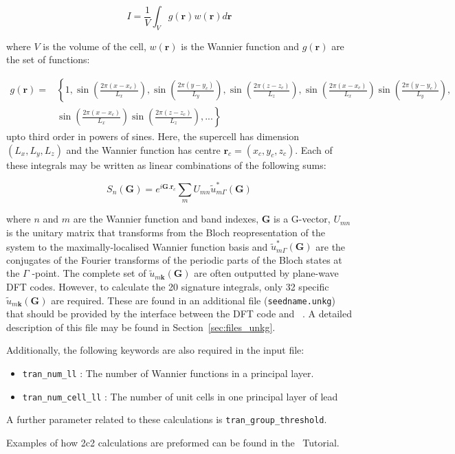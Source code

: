 \begin{equation}
I=\frac{1}{V}\int_V g(\mathbf{r})w(\mathbf{r})d\mathbf{r}
\label{eq:sig_ints}
\end{equation}

where $V$ is the volume of the cell, $w(\mathbf{r})$ is the Wannier 
function and $g(\mathbf{r})$ are the set of functions:

\begin{eqnarray}
g(\mathbf{r})=&\left\lbrace1,\sin\left(\frac{2\pi (x-x_c)}{L_x}\right),
											 \sin\left(\frac{2\pi (y-y_c)}{L_y}\right),
											 \sin\left(\frac{2\pi (z-z_c)}{L_z}\right),
											 \sin\left(\frac{2\pi (x-x_c)}{L_x}\right)
											 \sin\left(\frac{2\pi (y-y_c)}{L_y}\right),\right.\nonumber \\
										   &\left.\sin\left(\frac{2\pi (x-x_c)}{L_x}\right)
											 \sin\left(\frac{2\pi (z-z_c)}{L_z}\right),
											 ... \right\rbrace
\label{eq:g(r)}
\end{eqnarray}
upto third order in powers of sines. Here, the supercell has dimension 
$(L_x,L_y,L_z)$ and the Wannier function has centre $\mathbf{r}_c=(x_c,y_c,z_c)$.
Each of these integrals may be written as linear combinations 
of the following sums:

\begin{equation}
S_n(\mathbf{G})=\displaystyle{e^{i\mathbf{G.r}_{c}}\sum_{m}U_{mn}\tilde{u}_{m\Gamma}^{*}(\mathbf{G})}
\end{equation}

where $n$ and $m$ are the Wannier function and band indexes, 
$\mathbf{G}$ is a G-vector, $U_{mn}$ is the unitary matrix that 
transforms from the Bloch reopresentation of the system to the 
maximally-localised Wannier function basis and 
$\tilde{u}_{m\Gamma}^{*}(\mathbf{G})$ are the conjugates of the 
Fourier transforms of the periodic parts of the Bloch states at the $\Gamma\!$
-point. The complete set of $\tilde{u}_{m\mathbf{k}}(\mathbf{G})$ 
are often outputted by plane-wave DFT codes. However, to calculate the 20 
signature integrals, only 32 specific $\tilde{u}_{m\mathbf{k}}(\mathbf{G})$ 
are required. These are found in an additional file (\verb#seedname.unkg#) 
that should be provided by the interface between the DFT code and \wannier\ . 
A detailed description of this file may be found in Section~\ref{sec:files_unkg}.

Additionally, the following keywords are also required in the input file:
\begin{itemize}
\item \verb#tran_num_ll# : The number of Wannier functions in a 
principal layer.
\item \verb#tran_num_cell_ll# : The number of unit cells in one 
principal layer of lead
\end{itemize}

A further parameter related to these calculations is
\verb#tran_group_threshold#.

Examples of how 2c2 calculations are preformed can be found 
in the \wannier\ Tutorial. 
